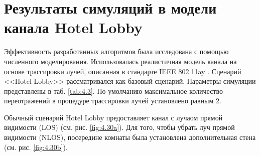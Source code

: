 \section{Результаты симуляций в модели канала Hotel Lobby}
\label{sec:simulations}
Эффективность разработанных алгоритмов была исследована с помощью численного
моделирования. Использовалась реалистичная модель канала на основе трассировки
лучей, описанная в стандарте IEEE 802.11ay  \cite{Maltsev2017}. Сценарий
<<Hotel Lobby>> рассматривался как базовый сценарий.
Параметры симуляции представлены в таб. \ref{tab:4.3}.
По умолчанию максимальное количество переотражений в процедуре
трассировки лучей установлено равным 2.

Обычный сценарий Hotel Lobby предоставляет канал с лучаом прямой видимости (LOS)
(см. рис. \ref{fig:4.30a}). Для того, чтобы убрать луч прямой видимости (NLOS),
посередине комнаты была установлена дополнительная стена
(см. рис. \ref{fig:4.30b}).

